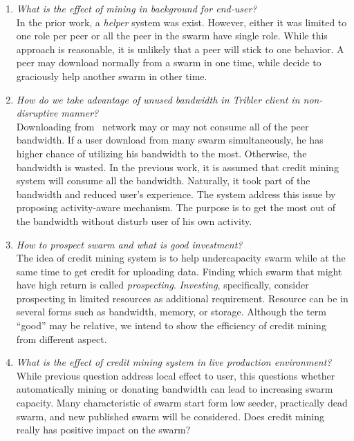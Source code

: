 \begin{enumerate}
	\item \textit{What is the effect of mining in background for end-user?}
	\\ In the prior work, a \textit{helper} system was exist. However, either it was limited to one role per peer or all the peer in the swarm have single role. While this approach is reasonable, it is unlikely that a peer will stick to one behavior. A peer may download normally from a swarm in one time, while decide to graciously help another swarm in other time.
	
	\item \textit{How do we take advantage of unused bandwidth in Tribler client in non-disruptive manner?}
	\\ Downloading from \bt~network may or may not consume all of the peer bandwidth. If a user download from many swarm simultaneously, he has higher chance of utilizing his bandwidth to the most. Otherwise, the bandwidth is wasted. In the previous work, it is assumed that credit mining system will consume all the bandwidth. Naturally, it took part of the bandwidth and reduced user's experience. The system address this issue by proposing activity-aware mechanism. The purpose is to get the most out of the bandwidth without disturb user of his own activity.
	
	\item \textit{How to prospect swarm and what is good investment?}
	\\ The idea of credit mining system is to help undercapacity swarm while at the same time to get credit for uploading data. Finding which swarm that might have high return is called \textit{prospecting}. \textit{Investing}, specifically, consider prospecting in limited resources as additional requirement. Resource can be in several forms such as bandwidth, memory, or storage. Although the term ``good'' may be relative, we intend to show the efficiency of credit mining from different aspect.
	
	\item \textit{What is the effect of credit mining system in live production environment?}
	\\ While previous question address local effect to user, this questions whether automatically mining or donating bandwidth can lead to increasing swarm capacity. Many characteristic of swarm start form low seeder, practically dead swarm, and new published swarm will be considered. Does credit mining really has positive impact on the swarm?
	

\end{enumerate}
